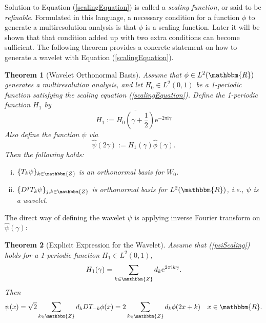 \documentclass{book}
\newcommand{\assign}{:=}
\newcommand{\mathe}{\mathrm{e}}
\newcommand{\mathi}{\mathrm{i}}
\newcommand{\mathpi}{\pi}
\newcommand{\tmtextit}[1]{{\itshape{#1}}}
\newenvironment{enumerateroman}{\begin{enumerate}[i.] }{\end{enumerate}}
\newtheorem{theorem}{Theorem}
\begin{document}
Solution to Equation (\ref{scalingEquation}) is called a \tmtextit{scaling
function}, or said to be \tmtextit{refinable}. Formulated in this language, a
necessary condition for a function $\phi$ to generate a multiresolution
analysis is that $\phi$ is a scaling function. Later it will be shown that
that condition added up with two extra conditions can become sufficient. The
following theorem provides a concrete statement on how to generate a wavelet
with Equation (\ref{scalingEquation}).

\begin{theorem}[Wavelet Orthonormal Basis]
  \label{thm:constructionWavelet}Assume that $\phi \in L^2 (\mathbbm{R})$
  generates a multiresolution analysis, and let $H_0 \in L^2 (0, 1)$ be a
  1-periodic function satisfying the scaling equation (\ref{scalingEquation}).
  Define the 1-periodic function $H_1$ by
  \begin{equation}
    H_1 \assign \overline{H_0 \left( \gamma + \frac{1}{2} \right)} \mathe^{- 2
    \mathpi \mathi \gamma} \label{h1}
  \end{equation}
  Also define the function $\psi$ via
  \begin{equation}
    \hat{\psi} (2 \gamma) \assign H_1 (\gamma) \hat{\phi} (\gamma) .
    \label{psiScaling}
  \end{equation}
  Then the following holds:
  \begin{enumerateroman}
    \item $\{ T_k \psi \}_{k \in \mathbbm{Z}}$ is an orthonormal basis for
    $W_0$.
    
    \item $\{ D^j T_k \psi \}_{j, k \in \mathbbm{Z}}$ is orthonormal basis for
    $L^2 (\mathbbm{R})$, i.e., $\psi$ is a wavelet.
  \end{enumerateroman}
\end{theorem}

The direct way of defining the wavelet $\psi$ is applying inverse Fourier
transform on $\hat{\psi} (\gamma)$:

\begin{theorem}[Explicit Expression for the Wavelet]
  Assume that (\ref{psiScaling}) holds for a 1-periodic function $H_1 \in L^2
  (0, 1)$,
  \[ H_1 (\gamma) = \sum_{k \in \mathbbm{Z}} d_k \mathe^{2 \mathpi \mathi k
     \gamma} . \]
  Then
  \begin{equation}
    \psi (x) = \sqrt{2} \sum_{k \in \mathbbm{Z}} d_k D T_{- k} \phi (x) = 2
    \sum_{k \in \mathbbm{Z}} d_k \phi (2 x + k) \quad x \in \mathbbm{R}.
    \label{psiScalingExplicit}
  \end{equation}
\end{theorem}
\end{document}
